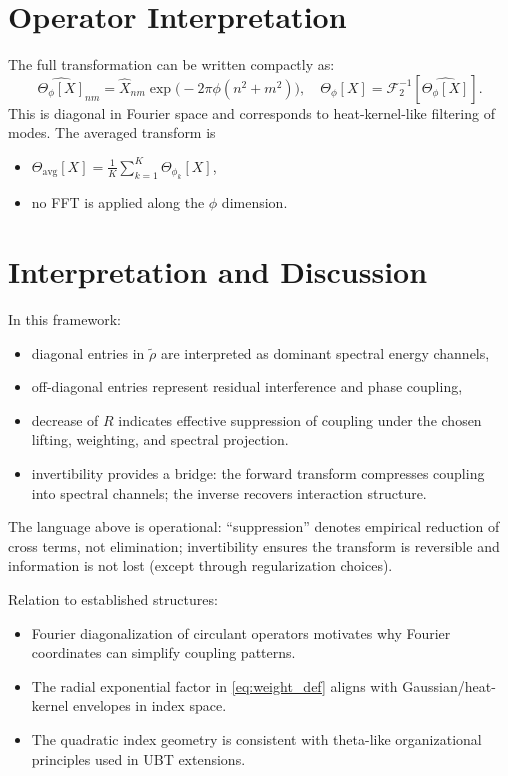\documentclass[11pt]{article}
\begin{document}
\section{Operator Interpretation}
The full transformation can be written compactly as:
\begin{equation}
\widehat{\Theta_{\phi}[X]}_{nm}=\widehat{X}_{nm}\exp\!\big(-2\pi\phi(n^2+m^2)\big), \quad \Theta_{\phi}[X]=\mathcal{F}_2^{-1}[\widehat{\Theta_{\phi}[X]}].
\label{eq:operator}
\end{equation}
This is diagonal in Fourier space and corresponds to heat-kernel-like filtering of modes.
The averaged transform is
\begin{itemize}
    \item $\Theta_{\mathrm{avg}}[X]=\frac{1}{K}\sum_{k=1}^{K}\Theta_{\phi_k}[X]$,
    \item no FFT is applied along the $\phi$ dimension.
\end{itemize}

\section{Interpretation and Discussion}
In this framework:
\begin{itemize}
    \item diagonal entries in $\widetilde{\rho}$ are interpreted as dominant spectral energy channels,
    \item off-diagonal entries represent residual interference and phase coupling,
    \item decrease of $R$ indicates effective suppression of coupling under the chosen lifting, weighting, and spectral projection.
    \item invertibility provides a bridge: the forward transform compresses coupling into spectral channels; the inverse recovers interaction structure.
\end{itemize}
The language above is operational: ``suppression'' denotes empirical reduction of cross terms, not elimination; invertibility ensures the transform is reversible and information is not lost (except through regularization choices).

Relation to established structures:
\begin{itemize}
    \item Fourier diagonalization of circulant operators motivates why Fourier coordinates can simplify coupling patterns.
    \item The radial exponential factor in \eqref{eq:weight_def} aligns with Gaussian/heat-kernel envelopes in index space.
    \item The quadratic index geometry is consistent with theta-like organizational principles used in UBT extensions.
\end{itemize}
\end{document}
